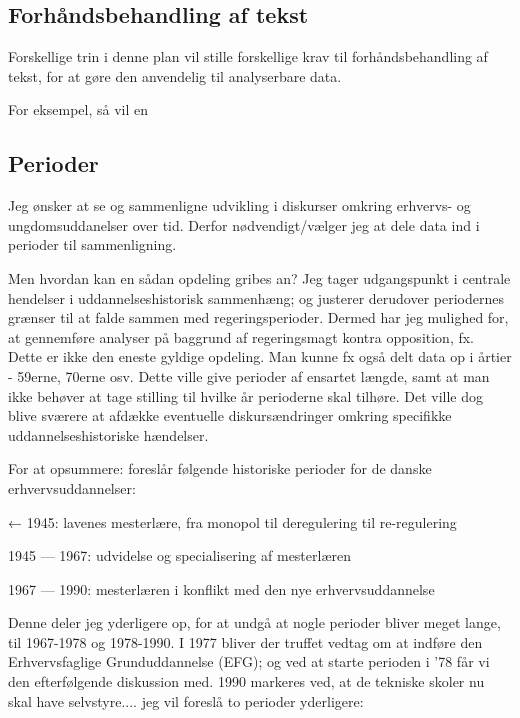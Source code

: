 \subsection{Forhåndsbehandling af tekst}

Forskellige trin i denne plan vil stille forskellige krav til forhåndsbehandling af tekst, for at gøre den anvendelig til analyserbare data.

For eksempel, så vil en 


\subsection{Perioder}\label{sec:periods}
Jeg ønsker at se og sammenligne udvikling i diskurser omkring erhvervs- og ungdomsuddanelser over tid.
Derfor nødvendigt/vælger jeg at dele data ind i perioder til sammenligning.

Men hvordan kan en sådan opdeling gribes an?
Jeg tager udgangspunkt i centrale hendelser i uddannelseshistorisk sammenhæng; og justerer derudover periodernes grænser til at falde sammen med regeringsperioder.
Dermed har jeg mulighed for, at gennemføre analyser på baggrund af regeringsmagt kontra opposition, fx.
Dette er ikke den eneste gyldige opdeling.
Man kunne fx også delt data op i årtier - 59erne, 70erne osv.
Dette ville give perioder af ensartet længde, samt at man ikke behøver at tage stilling til hvilke år perioderne skal tilhøre.
Det ville dog blive sværere at afdække eventuelle diskursændringer omkring specifikke uddannelseshistoriske hændelser.

For at opsummere: \citeauthor{bondergaardHistoricalEmergenceKey2014} foreslår følgende historiske perioder for de danske erhvervsuddannelser:

← 1945: lavenes mesterlære, fra monopol til deregulering til re-regulering

1945 --- 1967: udvidelse og specialisering af mesterlæren

1967 --- 1990: mesterlæren i konflikt med den nye erhvervsuddannelse

Denne deler jeg yderligere op, for at undgå at nogle perioder bliver meget lange, til 1967-1978 og 1978-1990.
I 1977 bliver der truffet vedtag om at indføre den Erhvervsfaglige Grunduddannelse (EFG); og ved at starte perioden i '78 får vi den efterfølgende diskussion med.
1990 markeres ved, at de tekniske skoler nu skal have selvstyre....
jeg vil foreslå to perioder yderligere:

